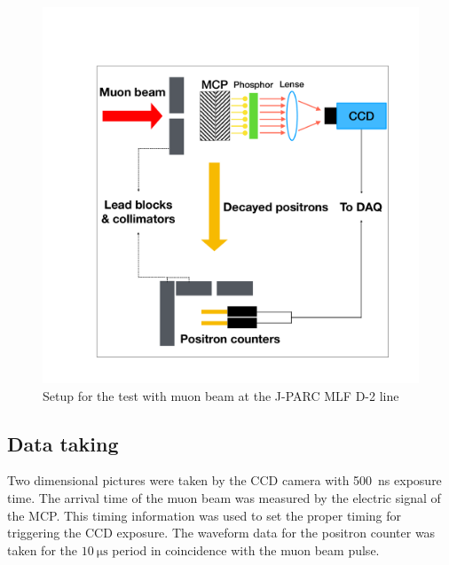 \documentclass[preprint,3p,twocolumn]{elsarticle}
\begin{document}
\begin{figure}[tb]
{\setlength{\belowdisplayskip}{0pt}
\begin{minipage}[t]{60mm}
\includegraphics[width=1.25\textwidth, height=1.25\textwidth]{figure/BPM_schematic.pdf}
\end{minipage}
}
\caption{Setup for the test with muon beam at the J-PARC MLF D-2 line}
\vspace{-0.4cm}
\label{fig:simulation}
\end{figure}

\subsection{Data taking} 
Two dimensional pictures were taken by the CCD camera with \SI{500}{\nano\s} exposure time.
The arrival time of the muon beam was measured by the electric signal of the MCP. This timing information was used 
to set the proper timing for triggering the CCD exposure. The waveform data for the positron counter was taken for the $\SI{10}{\micro\s}$ period in coincidence with the muon beam pulse.
\end{document}
